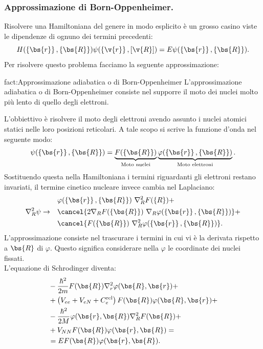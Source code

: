 \subsubsection{Approssimazione di Born-Oppenheimer.}%
\label{subsub:Approssimazione di Born-Oppenheimer.}
Risolvere una Hamiltoniana del genere in modo esplicito è un grosso casino viste le dipendenze di ognuno dei termini precedenti:
\[
    H(\left\{ \bs{r} \right\}, \left\{ \bs{R} \right\}) \psi (\left\{\v{r}\right\}, \left[\v{R}\right]) 
	=
	E \psi(\left\{ \bs{r} \right\} , \left\{ \bs{R} \right\} )
.\] 
Per risolvere questo problema facciamo la seguente approssimazione:
\begin{fact}{fact:Approssimazione adiabatica o di Born-Oppenheimer}
L'approssimazione adiabatica o di Born-Oppenheimer consiste nel supporre il moto dei nuclei molto più lento di quello degli elettroni.
\end{fact}
L'obbiettivo è risolvere il moto degli elettroni avendo assunto i nuclei atomici statici nelle loro posizioni reticolari.
A tale scopo si scrive la funzione d'onda nel seguente modo:
\[
	\psi(\left\{ \bs{r} \right\}, \left\{ \bs{R} \right\} )
	=
	\underbrace{F(\left\{ \bs{R} \right\})}_
	{\substack{\text{Moto nuclei}}}
	\underbrace{\varphi(\left\{\bs{r}\right\},\left\{\bs{R}\right\} )}_
	{\substack{\text{Moto elettroni}}}
.\] 
Sostituendo questa nella Hamiltoniana i termini riguardanti gli elettroni restano invariati, il termine cinetico nucleare invece cambia nel Laplaciano:
\[\begin{aligned}
& 			&		&\varphi(\left\{ \bs{r} \right\}, \left\{ \bs{R} \right\}) \ \nabla^2_R F(\left\{ R \right\} ) +\\
\nabla^2_R \psi&\to 	& 		&\cancel{2\nabla_RF(\left\{\bs{R}\right\}) \ \nabla_R\varphi(\left\{ \bs{r} \right\},\left\{ \bs{R} \right\} )}+\\
&			&		&\cancel{F(\left\{ \bs{R} \right\} ) \ \nabla_R^2\varphi(\left\{ \bs{r} \right\},\left\{ \bs{R} \right\} )}
.\end{aligned}\]
L'approssimazione consiste nel trascurare i termini in cui vi è la derivata rispetto a $\bs{R}$ di $\varphi$. Questo significa considerare nella $\varphi$ le coordinate dei nuclei fissati.\\
L'equazione di Schrodinger diventa:
\[\begin{aligned}
	&-\frac{\hbar ^2}{2m}F(\bs{R})\nabla _r^2\varphi(\bs{R},\bs{r}) +\\
	&+\left( V_{ee} + V_{eN} + C_e^{\text{rel}} \right)
	F(\bs{R})\varphi(\bs{R},\bs{r})+\\
	&- \frac{\hbar ^2}{2M}\varphi(\bs{r},\bs{R})\nabla_R^2F(\bs{R}) +\\
	&+V_{NN}F(\bs{R})\varphi(\bs{r},\bs{R}) =\\
	&=EF(\bs{R})\varphi(\bs{r},\bs{R})
.\end{aligned}\]
